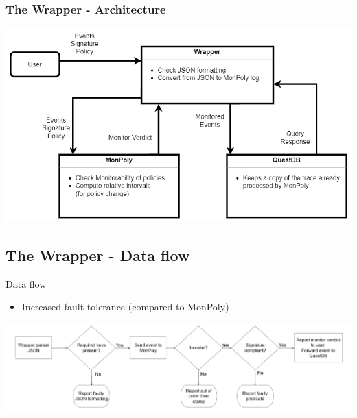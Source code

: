 \begin{frame}
    \frametitle{The Wrapper - Architecture}
    \centering
    \includegraphics[width=\linewidth]{diagrams/wrapper.png}
\end{frame}

\subsection{The Wrapper - Data flow}

\begin{frame}{Data flow}
    \begin{itemize}
        \item Increased fault tolerance (compared to MonPoly)
    \end{itemize}
    \vspace{1cm}
    \includegraphics[width=1.0\linewidth]{diagrams/flowchart-2.png}
\end{frame}